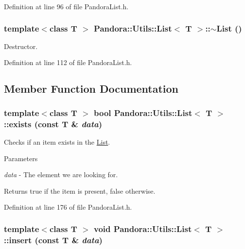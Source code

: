 Definition at line 96 of file PandoraList.h.\hypertarget{classPandora_1_1Utils_1_1List_a4014a2867a09df28421939d4732a7907}{
\subsubsection[{$\sim$List}]{\setlength{\rightskip}{0pt plus 5cm}template$<$class T $>$ {\bf Pandora::Utils::List}$<$ T $>$::$\sim${\bf List} ()}}
\label{classPandora_1_1Utils_1_1List_a4014a2867a09df28421939d4732a7907}


Destructor. 

Definition at line 112 of file PandoraList.h.

\subsection{Member Function Documentation}
\hypertarget{classPandora_1_1Utils_1_1List_ad15fe96a79420346c975e96eb23f35ea}{
\subsubsection[{exists}]{\setlength{\rightskip}{0pt plus 5cm}template$<$class T $>$ bool {\bf Pandora::Utils::List}$<$ T $>$::exists (const T \& {\em data})}}
\label{classPandora_1_1Utils_1_1List_ad15fe96a79420346c975e96eb23f35ea}


Checks if an item exists in the \hyperlink{classPandora_1_1Utils_1_1List}{List}. 
\begin{DoxyParams}{Parameters}
\item[{\em data}]-\/ The element we are looking for. \end{DoxyParams}
\begin{DoxyReturn}{Returns}
true if the item is present, false otherwise. 
\end{DoxyReturn}


Definition at line 176 of file PandoraList.h.\hypertarget{classPandora_1_1Utils_1_1List_a613c9a325c0e2916241acbd453d7b295}{
\subsubsection[{insert}]{\setlength{\rightskip}{0pt plus 5cm}template$<$class T $>$ void {\bf Pandora::Utils::List}$<$ T $>$::insert (const T \& {\em data})}}
\label{classPandora_1_1Utils_1_1List_a613c9a325c0e2916241acbd453d7b295}


